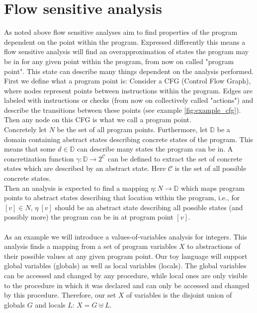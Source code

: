   \section{Flow sensitive analysis}
    As noted above flow sensitive analyses aim to find properties of the program dependent on the point within the program. Expressed differently this means a flow sensitive analysis will find an overapproximation of states the program may be in for any given point within the program, from now on called "program point". This state can describe many things dependent on the analysis performed.\\
    First we define what a program point is: Consider a CFG (Control Flow Graph), where nodes represent points between instructions within the program. Edges are labeled with instructions or checks (from now on collectively called "actions") and describe the transitions between these points (see example \autoref{fig:example_cfg}). Then any node on this CFG is what we call a program point.\\
    Concretely let $N$ be the set of all program points. Furthermore, let $\mathbb{D}$ be a domain containing abstract states describing concrete states of the program. This means that some $d \in \mathbb{D}$ can describe many states the program can be in. A concretization function $\gamma: \mathbb{D} \rightarrow 2^{\mathcal{C}}$ can be defined to extract the set of concrete states which are described by an abstract state. Here $\mathcal{C}$ is the set of all possible concrete states.\\ 
    Then an analysis is expected to find a mapping $\eta: N \rightarrow \mathbb{D}$ which maps program points to abstract states describing that location within the program, i.e., for $[v] \in N$, $\eta\ [v]$ should be an abstract state describing all possible states (and possibly more) the program can be in at program point $[v]$.\\
    \\
    As an example we will introduce a values-of-variables analysis for integers. This analysis finds a mapping from a set of program variables $X$ to abstractions of their possible values at any given program point. Our toy language will support global variables (globals) as well as local variables (locals). The global variables can be accessed and changed by any procedure, while local ones are only visible to the procedure in which it was declared and can only be accessed and changed by this procedure. Therefore, our set $X$ of variables is the disjoint union of globals $G$ and locals $L$: $X = G \uplus L$.
